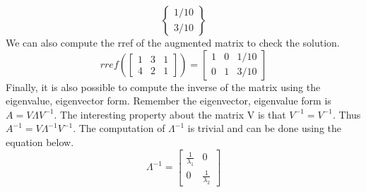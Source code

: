 \begin{enumerate}
\begin{equation}
\begin{Bmatrix}
  1/10 \\ 3/10 \end{Bmatrix}
\end{equation}
We can also compute the rref of the augmented matrix to check the
solution.
\begin{equation}
rref(\begin{bmatrix}
1 & 3 & 1 \\
4 & 2 & 1
\end{bmatrix}) = \begin{bmatrix}
1 & 0 & 1/10 \\
0 & 1 & 3/10
\end{bmatrix}
\end{equation}
Finally, it is also possible to compute the inverse of the matrix
using the eigenvalue, eigenvector form. Remember the eigenvector,
eigenvalue form is $A=V \Lambda V^{-1}$. The interesting property about
the matrix V is that $V^{-1}=V^{-1}$. Thus $A^{-1} = V {\Lambda}^{-1}
V^{-1}$. The computation of $\Lambda^{-1}$ is trivial and can be done
using the equation below.
\begin{equation}
\Lambda^{-1} = \begin{bmatrix} \frac{1}{\lambda_1} & 0 \\ 0 & \frac{1}{\lambda_2} \end{bmatrix}
\end{equation}

\end{enumerate}



